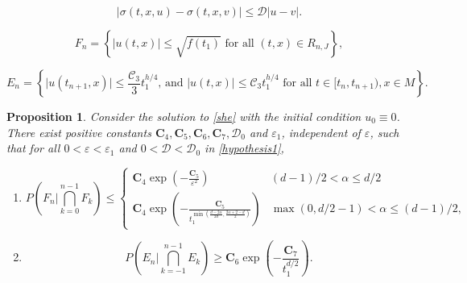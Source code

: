 \documentclass[10pt,a4paper]{amsart}
\newtheorem{prop}{Proposition}
\begin{document}
\begin{equation}
\label{hypothesis1}
\vert \sigma(t,x,u)-\sigma(t,x,v)\vert\leq\mathcal{D}|u-v|.
\end{equation}

\begin{equation}
\label{Fn}
F_n=\left\lbrace\vert u(t,x)\vert\leq \sqrt{f(t_1)}\text{ for all } (t,x)\in R_{n,J}\right\rbrace,
\end{equation}

\begin{equation}
\label{En}
E_n=\left\lbrace\vert u(t_{n+1},x)\vert\leq \frac{\mathcal{C}_3}{3}t_1^{h/4},\,\text{and }\vert u(t,x)\vert\leq \mathcal{C}_3t_1^{h/4}\text{ for all } t\in[t_n,t_{n+1}),x\in M\right\rbrace.
\end{equation}

\begin{prop}
\label{prop}
Consider the solution to \eqref{she} with the initial condition $u_0\equiv 0$. There exist positive constants $\textbf{C}_4,\textbf{C}_5,\textbf{C}_6,\textbf{C}_7,\mathcal{D}_0$ and $\varepsilon_1$, independent of $\varepsilon$, such that for all $0<\varepsilon<\varepsilon_1$ and $0<\mathcal{D}<\mathcal{D}_0$ in \eqref{hypothesis1}, 
\begin{enumerate}
\item[(a)]
\begin{equation*}
P\left(F_n\bigg| \bigcap_{k=0}^{n-1}F_k\right)\leq\begin{cases}
    \textbf{C}_4\exp\left(-\frac{\textbf{C}_5}{\varepsilon^2}\right)&(d-1)/2<\alpha\leq d/2\\
    \textbf{C}_4\exp\left(-\frac{\textbf{C}_5}{t_1^{\min\left(\frac{d-2\alpha}{2d},\frac{2\alpha+2-d}{2}\right)}}\right)&\max(0,d/2-1)<\alpha\leq(d-1)/2,
\end{cases}
\end{equation*}
\item[(b)] 
\begin{equation*}
P\left(E_n\bigg| \bigcap_{k=-1}^{n-1}E_k\right)\geq \textbf{C}_6\exp\left(-\frac{\textbf{C}_7}{t_1^{d/2}}\right).
\end{equation*}
\end{enumerate}
\end{prop}
\end{document}
